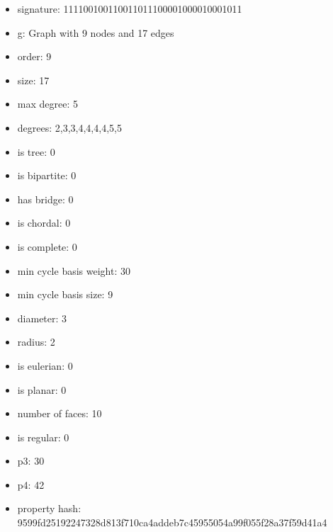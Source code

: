 \newpage
\begin{figure}
\end{figure}
\begin{itemize}
\item signature: 111100100110011011100001000010001011
\item g: Graph with 9 nodes and 17 edges
\item order: 9
\item size: 17
\item max degree: 5
\item degrees: 2,3,3,4,4,4,4,5,5
\item is tree: 0
\item is bipartite: 0
\item has bridge: 0
\item is chordal: 0
\item is complete: 0
\item min cycle basis weight: 30
\item min cycle basis size: 9
\item diameter: 3
\item radius: 2
\item is eulerian: 0
\item is planar: 0
\item number of faces: 10
\item is regular: 0
\item p3: 30
\item p4: 42
\item property hash: 9599fd25192247328d813f710ca4addeb7c45955054a99f055f28a37f59d41a4
\end{itemize}

